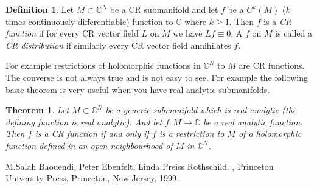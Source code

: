 \documentclass[12pt]{article}
\theoremstyle{theorem}
\newtheorem*{thm}{Theorem}
\theoremstyle{definition}
\newtheorem*{defn}{Definition}
\begin{document}
\begin{defn}
Let $M \subset {\mathbb{C}}^N$ be a CR submanifold and let $f$ be a 
$C^k(M)$ ($k$ times continuously differentiable) function to ${\mathbb{C}}$
where $k \geq 1$.  Then $f$ is a {\em CR function} if for every CR vector
field $L$ on $M$ we have $Lf \equiv 0$.  A
$f$ on $M$ is called a
{\em CR distribution} if similarly every CR vector field annihilates $f$.
\end{defn}

For example restrictions of holomorphic functions in ${\mathbb{C}}^N$ to
$M$ are CR functions.  The converse is not always true and is not easy to
see.  For example the following basic theorem is very useful when you have
real analytic submanifolds.

\begin{thm}
Let $M \subset {\mathbb{C}}^N$ be a generic submanifold which is real
analytic (the defining function is real analytic).  And let $f \colon M \to
{\mathbb{C}}$ be a real analytic function.  Then $f$ is a CR function if
and only if $f$ is a restriction to $M$ of a holomorphic function
defined in an open neighbourhood of $M$ in ${\mathbb{C}}^N$.
\end{thm}

\begin{thebibliography}{9}
M.\@ Salah Baouendi,
Peter Ebenfelt,
Linda Preiss Rothschild.
{\em {}},
Princeton University Press,
Princeton, New Jersey, 1999.
\end{thebibliography}
\end{document}
